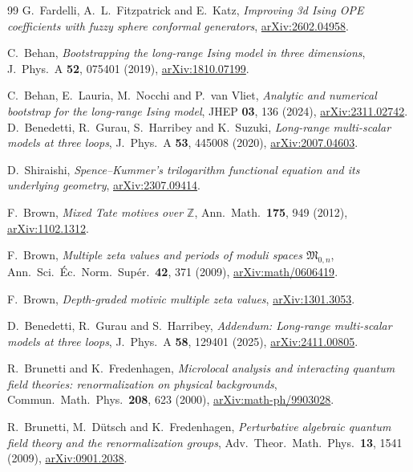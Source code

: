 \begin{thebibliography}{99}
G.~Fardelli, A.~L.~Fitzpatrick and E.~Katz,
\emph{Improving 3d Ising OPE coefficients with fuzzy sphere conformal generators},
\href{https://arxiv.org/abs/2602.04958}{arXiv:2602.04958}.

C.~Behan,
\emph{Bootstrapping the long-range Ising model in three dimensions},
J.\ Phys.\ A \textbf{52}, 075401 (2019),
\href{https://arxiv.org/abs/1810.07199}{arXiv:1810.07199}.

C.~Behan, E.~Lauria, M.~Nocchi and P.~van Vliet,
\emph{Analytic and numerical bootstrap for the long-range Ising model},
JHEP \textbf{03}, 136 (2024),
\href{https://arxiv.org/abs/2311.02742}{arXiv:2311.02742}.
D.~Benedetti, R.~Gurau, S.~Harribey and K.~Suzuki,
\emph{Long-range multi-scalar models at three loops},
J.\ Phys.\ A \textbf{53}, 445008 (2020),
\href{https://arxiv.org/abs/2007.04603}{arXiv:2007.04603}.

D.~Shiraishi,
\emph{Spence--Kummer's trilogarithm functional equation and its underlying geometry},
\href{https://arxiv.org/abs/2307.09414}{arXiv:2307.09414}.

F.~Brown,
\emph{Mixed Tate motives over $\mathbb Z$},
Ann.\ Math.\ \textbf{175}, 949 (2012),
\href{https://arxiv.org/abs/1102.1312}{arXiv:1102.1312}.

F.~Brown,
\emph{Multiple zeta values and periods of moduli spaces $\mathfrak M_{0,n}$},
Ann.\ Sci.\ \'Ec.\ Norm.\ Sup\'er.\ \textbf{42}, 371 (2009),
\href{https://arxiv.org/abs/math/0606419}{arXiv:math/0606419}.

F.~Brown,
\emph{Depth-graded motivic multiple zeta values},
\href{https://arxiv.org/abs/1301.3053}{arXiv:1301.3053}.

D.~Benedetti, R.~Gurau and S.~Harribey,
\emph{Addendum: Long-range multi-scalar models at three loops},
J.\ Phys.\ A \textbf{58}, 129401 (2025),
\href{https://arxiv.org/abs/2411.00805}{arXiv:2411.00805}.

R.~Brunetti and K.~Fredenhagen,
\emph{Microlocal analysis and interacting quantum field theories: renormalization on physical backgrounds},
Commun.\ Math.\ Phys.\ \textbf{208}, 623 (2000),
\href{https://arxiv.org/abs/math-ph/9903028}{arXiv:math-ph/9903028}.

R.~Brunetti, M.~D\"utsch and K.~Fredenhagen,
\emph{Perturbative algebraic quantum field theory and the renormalization groups},
Adv.\ Theor.\ Math.\ Phys.\ \textbf{13}, 1541 (2009),
\href{https://arxiv.org/abs/0901.2038}{arXiv:0901.2038}.


\end{thebibliography}
